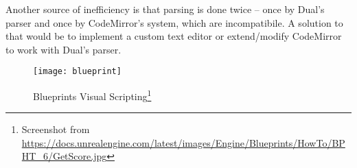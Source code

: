 Another source of inefficiency is that parsing is done twice -- once by Dual's parser and once by CodeMirror's system, which are incompatibile.
A solution to that would be to implement a custom text editor or extend/modify CodeMirror to work with Dual's parser.


\begin{figure}[h!]
\centering
\texttt{[image: blueprint]}
\caption{Blueprints Visual Scripting\protect\footnote{Screenshot from  \url{https://docs.unrealengine.com/latest/images/Engine/Blueprints/HowTo/BPHT_6/GetScore.jpg}}}
\label{fig:blueprint}
\end{figure}